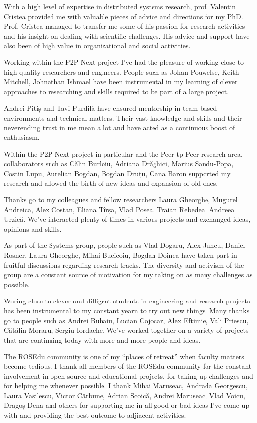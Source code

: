 With a high level of expertise in distributed systems research, prof. Valentin
Cristea provided me with valuable pieces of advice and directions for my PhD.
Prof. Cristea managed to transfer me some of his passion for research
activities and his insight on dealing with scientific challenges. His advice
and support have also been of high value in organizational and social
activities.

Working within the P2P-Next project I've had the pleasure of working close to
high quality researchers and engineers. People such as Johan Pouwelse, Keith
Mitchell, Johnathan Ishmael have been instrumental in my learning of clever
approaches to researching and skills required to be part of a large project.

Andrei Pitiș and Tavi Purdilă have ensured mentorship in team-based
environments and technical matters. Their vast knowledge and skills and their
neverending trust in me mean a lot and have acted as a continuous boost of
enthusiasm.

Within the P2P-Next project in particular and the Peer-tp-Peer research area,
collaborators such as Călin Burloiu, Adriana Drăghici, Marius Sandu-Popa,
Costin Lupu, Aurelian Bogdan, Bogdan Druțu, Oana Baron supported my research
and allowed the birth of new ideas and expansion of old ones.

Thanks go to my colleagues and fellow researchers Laura Gheorghe, Mugurel
Andreica, Alex Costan, Eliana Tîrșa, Vlad Posea, Traian Rebedea, Andreea
Urzică. We've interacted plenty of times in various projects and exchanged
ideas, opinions and skills.

As part of the Systems group, people such as Vlad Dogaru, Alex Juncu, Daniel
Rosner, Laura Gheorghe, Mihai Bucicoiu, Bogdan Doinea have taken part in
fruitful discussions regarding research tracks. The diversity and activism of
the group are a constant source of motivation for my taking on as many
challenges as possible.

Woring close to clever and dilligent students in engineering and research
projects has been instrumental to my constant yearn to try out new things.
Many thanks go to people such as Andrei Buhaiu, Lucian Cojocar, Alex Eftimie,
Vali Priescu, Cătălin Moraru, Sergiu Iordache. We've worked together on a
variety of projects that are continuing today with more and more people and
ideas.

The ROSEdu community is one of my ``places of retreat'' when faculty matters
become tedious. I thank all members of the ROSEdu community for the constant
involvement in open-source and educational projects, for taking up challenges
and for helping me whenever possible. I thank Mihai Maruseac, Andrada
Georgescu, Laura Vasilescu, Victor Cărbune, Adrian Scoică, Andrei Maruseac,
Vlad Voicu, Dragoș Dena and others for supporting me in all good or bad ideas
I've come up with and providing the best outcome to adjiacent activities.

